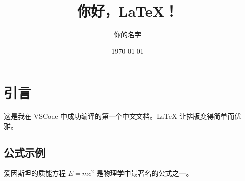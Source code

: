 \documentclass[UTF8]{ctexart}
\title{你好，LaTeX！}
\author{你的名字}
\date{\today}
\begin{document}
\maketitle

\section{引言}
这是我在 VSCode 中成功编译的第一个中文文档。LaTeX 让排版变得简单而优雅。

\subsection{公式示例}
爱因斯坦的质能方程 $E = mc^2$ 是物理学中最著名的公式之一。
\end{document}
